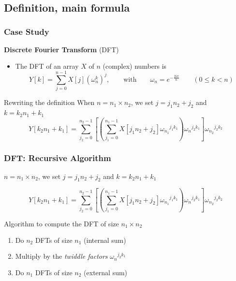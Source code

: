 \documentclass[xcolor={rgb,x11names,svgnames},rgb,x11names,svgnames]{beamer}
\begin{document}
\subsection{Definition, main formula}
\begin{frame}[label=fftdef]
  \frametitle{Case Study}

  \begin{block}{\textbf{Discrete Fourier Transform} (DFT)}
  \begin{itemize}
  \item The DFT of an array $X$ of $n$ (complex) numbers is
\[
  Y[k] = \sum_{j=0}^{n-1} X[j] \left(\omega_n^{k}\right)^j, \qquad \text{with} \qquad \omega_n = e^{-\frac{2i\pi}{n}} \qquad (0 \leq k < n)
\]
\end{itemize}
\end{block}

\medskip

\begin{alertblock}{Rewriting the definition}
When $n = n_1 \times n_2$, we set
$j = j_1 n_2 + j_2$ and $k = k_2 n_1 + k_1$ 
\[
Y[k_2 n_1 + k_1] = \sum_{j_2 = 0}^{n_2 - 1} \left[ \left( \sum_{j_1 = 0}^{n_1 - 1} X[j_1n_2 + j_2] {\omega_{n_1}}^{j_1 k_1} \right) {\omega_n}^{j_2 k_1} \right] {\omega_{n_2}}^{j_2 k_2}
\]
\end{alertblock}

\end{frame}


\begin{frame}[label=fftdef]
  \frametitle{DFT: Recursive Algorithm}

$n = n_1 \times n_2$, we set $j = j_1 n_2 + j_2$ and $k = k_2 n_1 + k_1$ 

\[
Y[k_2 n_1 + k_1] = \sum_{j_2 = 0}^{n_2 - 1} \left[ \left( \sum_{j_1 = 0}^{n_1 - 1} X[j_1n_2 + j_2] {\omega_{n_1}}^{j_1 k_1} \right) {\omega_n}^{j_2 k_1} \right] {\omega_{n_2}}^{j_2 k_2}
\]
  
\begin{block}{Algorithm to compute the DFT of size $n_1 \times n_2$}
  \begin{enumerate}
  \item Do $n_2$ DFTs of size $n_1$ (internal sum)
  \item Multiply by the \emph{twiddle factors} ${\omega_n}^{j_2 k_1}$
  \item Do $n_1$ DFTs of size $n_2$ (external sum)
  \end{enumerate}
\end{block}
\end{frame}
\end{document}
